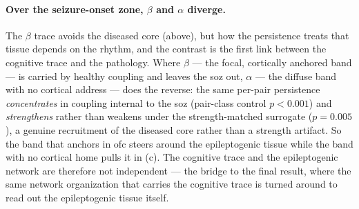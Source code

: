 %

\paragraph{Over the seizure-onset zone, \(\beta\) and \(\alpha\) diverge.}
The \(\beta\) trace avoids the diseased core (above), but how the persistence treats that tissue depends on the rhythm, and the contrast is the first link between the cognitive trace and the pathology. Where \(\beta\) --- the focal, cortically anchored band --- is carried by healthy coupling and leaves the \gls{soz} out, \(\alpha\) --- the diffuse band with no cortical address --- does the reverse: the same per-pair persistence \emph{concentrates} in coupling internal to the \gls{soz} (pair-class control \(p < 0.001\)) and \emph{strengthens} rather than weakens under the strength-matched surrogate (\(p = 0.005\)), a genuine recruitment of the diseased core rather than a strength artifact. So the band that anchors in \gls{ofc} steers around the epileptogenic tissue while the band with no cortical home pulls it in (c). The cognitive trace and the epileptogenic network are therefore not independent --- the bridge to the final result, where the same network organization that carries the cognitive trace is turned around to read out the epileptogenic tissue itself.
